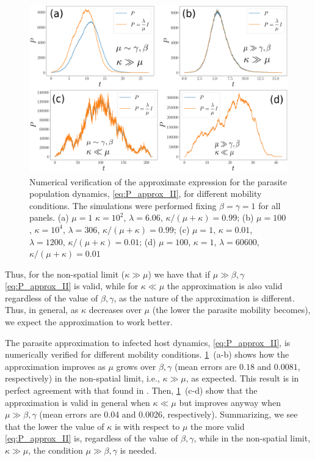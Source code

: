 \begin{figure}[H]
    \centering
    \includegraphics[width=\columnwidth]{Figures/P_approx.png}
    \caption[Validation of the approximate expression for the parasite
        population dynamics]{Numerical verification of the approximate
        expression for the parasite population dynamics, \cref{eq:P_approx_II},
        for different mobility conditions. The simulations were performed
        fixing $\beta=\gamma=1$ for all panels. (a) $\mu=1$ $\kappa=10^2$,
        $\lambda=6.06$, $\kappa/(\mu+\kappa)=0.99$;
        (b) $\mu=100$, $\kappa=10^4$, $\lambda=306$,
        $\kappa/(\mu+\kappa)=0.99$; (c)
        $\mu=1$, $\kappa=0.01$, $\lambda=1200$, $\kappa/(\mu+\kappa)=0.01$; (d)
        $\mu=100$, $\kappa=1$, $\lambda=60600$,  $\kappa/(\mu+\kappa)=0.01$}
    \label{fig:P_approx}
\end{figure}

Thus, for the non-spatial limit ($\kappa\gg\mu$) we have that if
$\mu\gg\beta,\gamma$ \cref{eq:P_approx_II} is valid, while for $\kappa\ll\mu$
the
approximation is also valid regardless of the value of $\beta,\gamma$, as the
nature of the approximation is different. Thus, in general, as $\kappa$
decreases over $\mu$ (the lower the parasite mobility becomes), we expect the
approximation to work better.

The parasite approximation to infected host dynamics, \cref{eq:P_approx_II},
is numerically verified for different mobility conditions.
\cref{fig:P_approx}~\textcolor{ref_color}{(a-b)} shows how the approximation
improves as $\mu$ grows
over $\beta,\gamma$ (mean errors are $0.18$ and $0.0081$, respectively) in the
non-spatial limit, i.e., $\kappa\gg\mu$, as expected. This result is in perfect
agreement with that found in \cite{GimenezRomero2021}. Then,
\cref{fig:P_approx}~\textcolor{ref_color}{(c-d)} show that the approximation is
valid in general when
$\kappa\ll\mu$ but improves anyway when $\mu\gg\beta,\gamma$ (mean errors are
0.04 and 0.0026, respectively). Summarizing, we see that the lower the value of
$\kappa$ is with respect to $\mu$ the more valid \cref{eq:P_approx_II} is,
regardless of the value of $\beta,\gamma$, while in the non-spatial limit,
$\kappa\gg\mu$, the condition $\mu\gg\beta,\gamma$ is needed.

